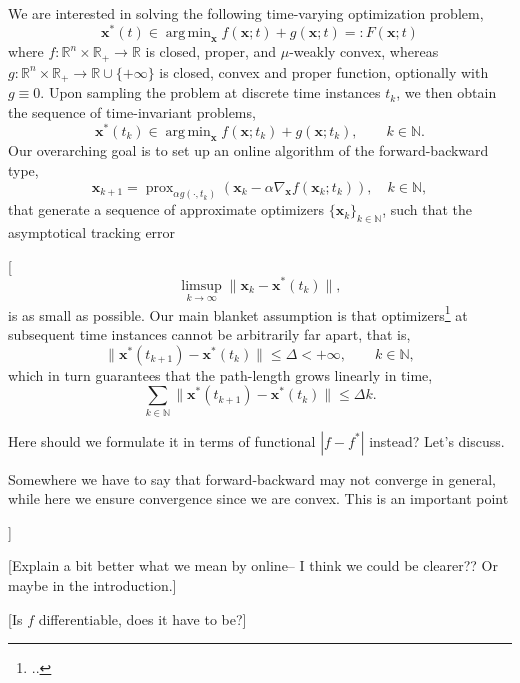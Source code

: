 \documentclass{article}
\DeclareMathOperator*{\argmin}{arg\,min}
\DeclareMathOperator{\prox}{prox}
\newcommand{\N}{\mathbb{N}}
\newcommand{\R}{\mathbb{R}}
\newcommand{\x}{\mathbold{x}}
\newcommand{\andrea}[1]{{\color{red}[#1]}}
\begin{document}
We are interested in solving the following time-varying optimization problem,
\begin{equation}\label{eq:continuous-time-problem}
	\x^*(t) \in \argmin_{\x} f(\x; t) + g(\x; t) =: F(\x; t)
\end{equation}
where $f : \R^n \times \R_+ \to \R$ is closed, proper, and $\mu$-weakly convex, whereas $g : \R^n \times \R_+ \to \R \cup \{ +\infty \}$ is closed, convex and proper function, optionally with $g \equiv 0$. Upon sampling the problem at discrete time instances $t_k$, we then obtain the sequence of time-invariant problems,
\begin{equation}\label{eq:base-problem}
	\x^*(t_k) \in \argmin_{\x} f(\x; t_k) + g(\x; t_k), \qquad k \in \N. 
\end{equation}
Our overarching goal is to set up an online algorithm of the forward-backward type,
\begin{equation}
\x_{k+1} = \prox_{\alpha g(\cdot, t_k)} (\x_k - \alpha \nabla_{\x} f(\x_k; t_k)), \quad k \in \N,
\end{equation}
that generate a sequence of approximate optimizers $\{\x_k\}_{k\in \N}$, such that the asymptotical tracking error \andrea{
\begin{equation}
\limsup_{k \to \infty} \|\x_k - \x^*(t_k)\|,
\end{equation}
is as small as possible. Our main blanket assumption is that optimizers\footnote{..} at subsequent time instances cannot be arbitrarily far apart, that is, 
\begin{equation}
\|\x^*(t_{k+1}) - \x^*(t_k)\| \leq \Delta < +\infty, \qquad k \in \N,
\end{equation}
which in turn guarantees that the path-length grows linearly in time, 
\begin{equation}
\sum_{k\in \N} \|\x^*(t_{k+1}) - \x^*(t_k)\| \leq \Delta k.
\end{equation}

Here should we formulate it in terms of functional $|f - f^*|$ instead? Let's discuss.

Somewhere we have to say that forward-backward may not converge in general, while here we ensure convergence since we are convex. This is an important point

}

\andrea{Explain a bit better what we mean by online-- I think we could be clearer?? Or maybe in the introduction.}

\andrea{Is $f$ differentiable, does it have to be?}
\end{document}
